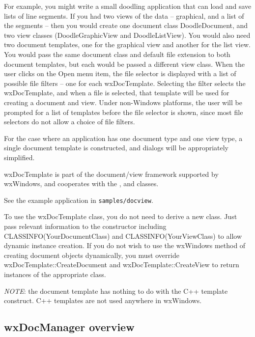 For example, you might write a small doodling application that can load
and save lists of line segments. If you had two views of the data -- graphical,
and a list of the segments -- then you would create one document class DoodleDocument,
and two view classes (DoodleGraphicView and DoodleListView). You would also
need two document templates, one for the graphical view and another for the
list view. You would pass the same document class and default file extension to both
document templates, but each would be passed a different view class. When
the user clicks on the Open menu item, the file selector is displayed
with a list of possible file filters -- one for each wxDocTemplate. Selecting
the filter selects the wxDocTemplate, and when
a file is selected, that template will be used for creating a document
and view. Under non-Windows platforms, the user will be prompted for
a list of templates before the file selector is shown, since most file selectors
do not allow a choice of file filters.

For the case where an application has one document type and one view type,
a single document template is constructed, and dialogs will be appropriately
simplified.

wxDocTemplate is part of the document/view framework supported by wxWindows,
and cooperates with the ,  
and  classes.

See the example application in {\tt samples/docview}.

To use the wxDocTemplate class, you do not need to derive a new class.
Just pass relevant information to the constructor including CLASSINFO(YourDocumentClass) and
CLASSINFO(YourViewClass) to allow dynamic instance creation.
If you do not wish to use the wxWindows method of creating document
objects dynamically, you must override wxDocTemplate::CreateDocument
and wxDocTemplate::CreateView to return instances of the appropriate class.

{\it NOTE}: the document template has nothing to do with the C++ template construct. C++
templates are not used anywhere in wxWindows.

\subsection{wxDocManager overview}\label{wxdocmanageroverview}


